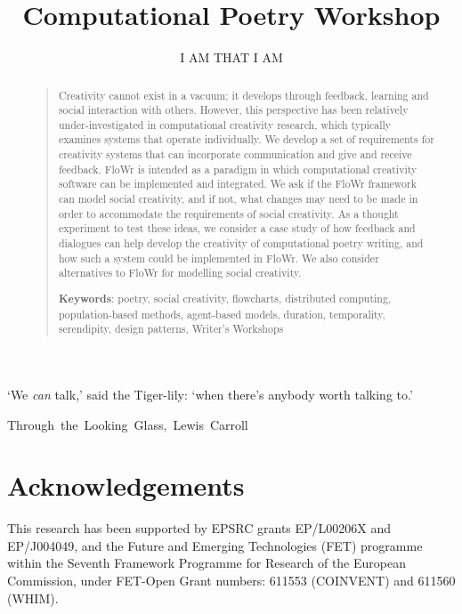 \documentclass[letterpaper]{article}
\title{Computational Poetry Workshop}
\author{I AM THAT I AM}
\newcommand*{\sourceatright}[1]{\unskip\hspace{1em plus 1fill}%
\nolinebreak[3]\hspace*{\fill}\mbox{#1}}%
\begin{document}
 
\maketitle
\begin{abstract}
\begin{quote}
Creativity cannot exist in a vacuum; it develops through feedback,
learning and social interaction with others. However, this perspective
has been relatively under-investigated in computational creativity
research, which typically examines systems that operate
individually. We develop a set of requirements for creativity systems
that can incorporate communication and give and receive
feedback. FloWr is intended as a paradigm in which computational
creativity software can be implemented and integrated. We ask if the
FloWr framework can model social creativity, and if not, what changes
may need to be made in order to accommodate the requirements of social
creativity. As a thought experiment to test these ideas, we consider a
case study of how feedback and dialogues can help develop the
creativity of computational poetry writing, and how such a system
could be implemented in FloWr. We also consider alternatives to FloWr
for modelling social creativity.

\medskip

\textbf{Keywords}: poetry, social creativity, flowcharts,
distributed computing, population-based methods, agent-based models,
duration, temporality, serendipity, design patterns, Writer's Workshops
\end{quote}
\end{abstract}


{\small `We \emph{can} talk,' said the Tiger-lily: `when there's anybody worth talking to.'

\sourceatright{Through the Looking Glass, Lewis Carroll}}








\section*{Acknowledgements} \label{sec:acknowledgements}
This research has been supported by EPSRC grants EP/L00206X and
EP/J004049, and the Future and Emerging Technologies (FET) programme
within the Seventh Framework Programme for Research of the European
Commission, under FET-Open Grant numbers: 611553 (COINVENT) and 611560
(WHIM).
\end{document}
